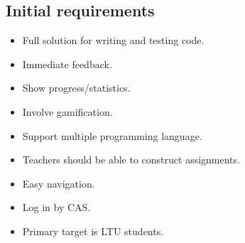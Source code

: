 \subsection{Initial requirements} 
 \begin{itemize}
\item Full solution for writing and testing code.
\item Immediate feedback.
\item Show progress/statistics.
\item Involve gamification.
\item Support multiple programming language.
\item Teachers should be able to construct assignments.
\item Easy navigation.
\item Log in by CAS. 
\item Primary target is LTU students.
 \end{itemize}
